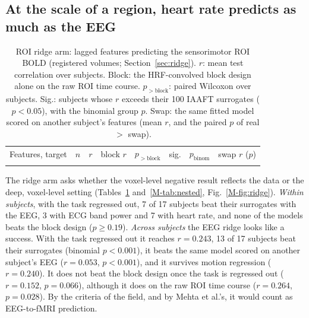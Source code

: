 \subsection{At the scale of a region, heart rate predicts as much as the EEG}\label{sec:res:ridge}
\begin{table}[!htbp]
	\centering
	\caption{ROI ridge arm: lagged features predicting the sensorimotor ROI BOLD (registered volumes; Section~\ref{sec:ridge}). $r$: mean test correlation over subjects. Block: the HRF-convolved block design alone on the raw ROI time course. $p_{>\mathrm{block}}$: paired Wilcoxon over subjects. Sig.: subjects whose $r$ exceeds their 100 IAAFT surrogates ($p<0.05$), with the binomial group $p$. Swap: the same fitted model scored on another subject's features (mean $r$, and the paired $p$ of real $>$ swap).}
	\label{tab:ridge}
	\small
	\begin{tabular}{lccccccc}
		\toprule
		Features, target & $n$ & $r$ & block $r$ & $p_{>\mathrm{block}}$ & sig. & $p_{\mathrm{binom}}$ & swap $r$ ($p$)\\
		\tabinput{tables/ridge}
		\bottomrule
	\end{tabular}
\end{table}





The ridge arm asks whether the voxel-level negative result reflects the data or the deep, voxel-level setting (Tables~\ref{tab:ridge} and~\ref{M-tab:nested}, Fig.~\ref{M-fig:ridge}). \emph{Within subjects}, with the task regressed out, 7 of 17 subjects beat their surrogates with the EEG, 3 with ECG band power and 7 with heart rate, and none of the models beats the block design ($p\ge0.19$). \emph{Across subjects} the EEG ridge looks like a success. With the task regressed out it reaches $r=0.243$, 13 of 17 subjects beat their surrogates (binomial $p<0.001$), it beats the same model scored on another subject's EEG ($r=0.053$, $p<0.001$), and it survives motion regression ($r=0.240$). It does not beat the block design once the task is regressed out ($r=0.152$, $p=0.066$), although it does on the raw ROI time course ($r=0.264$, $p=0.028$). By the criteria of the field, and by Mehta et al.'s, it would count as EEG-to-fMRI prediction.

